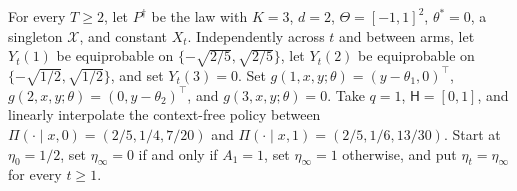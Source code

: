 For every \(T\ge2\), let \(P^{\dagger}\) be the law with \(K=3\), \(d=2\), \(\Theta=[-1,1]^2\), \(\theta^*=0\), a singleton \(\mathcal X\), and constant \(X_t\). Independently across \(t\) and between arms, let \(Y_t(1)\) be equiprobable on \(\{-\sqrt{2/5},\sqrt{2/5}\}\), let \(Y_t(2)\) be equiprobable on \(\{-\sqrt{1/2},\sqrt{1/2}\}\), and set \(Y_t(3)=0\). Set \(g(1,x,y;\theta)=(y-\theta_1,0)^\top\), \(g(2,x,y;\theta)=(0,y-\theta_2)^\top\), and \(g(3,x,y;\theta)=0\). Take \(q=1\), \(\mathsf H=[0,1]\), and linearly interpolate the context-free policy between \(\Pi(\cdot\mid x,0)=(2/5,1/4,7/20)\) and \(\Pi(\cdot\mid x,1)=(2/5,1/6,13/30)\). Start at \(\eta_0=1/2\), set \(\eta_\infty=0\) if and only if \(A_1=1\), set \(\eta_\infty=1\) otherwise, and put \(\eta_t=\eta_\infty\) for every \(t\ge1\).